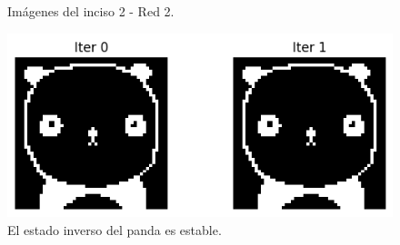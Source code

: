 \documentclass[11pt]{article} %
\begin{document}
\begin{figure}[p]
    \centering
    \\
    \\
    \caption{Imágenes del inciso 2 - Red 2.}
    \label{fig:ej2_b}
\end{figure}
\clearpage
\newpage

\begin{figure}[h!]
    \centering
    \includegraphics[width=0.8\linewidth]{imgs/ej1_3_1.png}
    \caption{El estado inverso del panda es estable.}
    \label{fig:ej1_3_1}
\end{figure}
\end{document}
